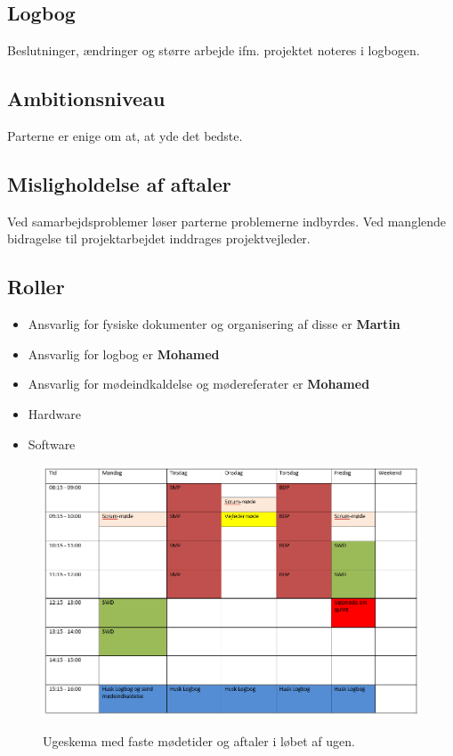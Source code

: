 \documentclass[main.tex]{subfiles}
\begin{document}
\subsection*{Logbog}
Beslutninger, ændringer og større arbejde ifm. projektet noteres i logbogen. 

\subsection*{Ambitionsniveau}
Parterne er enige om at, at yde det bedste. 
 
\subsection*{Misligholdelse af aftaler}
Ved samarbejdsproblemer løser parterne problemerne indbyrdes. 
Ved manglende bidragelse til projektarbejdet inddrages projektvejleder.

 
\subsection*{Roller}
\begin{itemize}
\item Ansvarlig for fysiske dokumenter og organisering af disse er \textbf{Martin}
\item Ansvarlig for logbog er \textbf{Mohamed}
\item Ansvarlig for mødeindkaldelse og mødereferater er \textbf{Mohamed}
\item{Hardware}
\item{Software}
\end{itemize}

\begin{figure}[H]
\centering
{\includegraphics[width=16cm]
{Figure/Ugeplan}}
\caption{Ugeskema med faste mødetider og aftaler i løbet af ugen.}
\label{ugeplan}
\end{figure}
\end{document}
